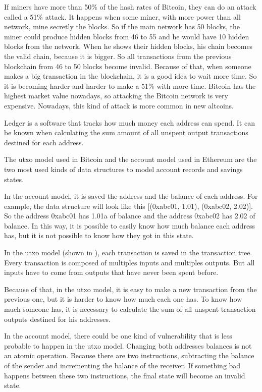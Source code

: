 If miners have more than 50\% of the hash rates of Bitcoin, they can do an attack called a
51\% attack.
It happens when some miner, with more power than all network, mine secretly the blocks.
So if the main network has 50 blocks, the miner could produce hidden blocks from 46 to 55
and he would have 10 hidden blocks from the network.
When he shows their hidden blocks, his chain becomes the valid chain, because it is bigger.
So all transactions from the previous blockchain from 46 to 50 blocks become invalid.
Because of that, when someone makes a big transaction in the blockchain, it is a good idea
to wait more time.
So it is becoming harder and harder to make a 51\% with more time.
Bitcoin has the highest market value nowadays, so attacking the Bitcoin network is very expensive.
Nowadays, this kind of attack is more common in new altcoins.

Ledger is a software that tracks how much money each address can spend.
It can be known when calculating the sum amount of all unspent output transactions destined
for each address.

The \gls{utxo} model used in Bitcoin and the account model used in Ethereum are the two most used kinds
of data structures to model account records and savings states.

In the account model, it is saved the address and the balance of each address.
For example, the data structure will look like this [(0xabc01, 1.01), (0xabc02, 2.02)].
So the address 0xabc01 has 1.01a of balance and the address 0xabc02 has 2.02 of balance.
In this way, it is possible to easily know how much balance each address has,
but it is not possible to know how they got in this state.


In the \gls{utxo} model (shown in ), each transaction is saved in the transaction tree.
Every transaction is composed of multiples inputs and multiples outputs.
But all inputs have to come from outputs that have never been spent before.

Because of that, in the \gls{utxo} model, it is easy to make a new transaction from the previous one,
but it is harder to know how much each one has.
To know how much someone has, it is necessary to calculate the sum of all unspent transaction outputs
destined for his addresses.

In the account model, there could be one kind of vulnerability
that is less probable to happen in the \gls{utxo} model.
Changing both addresses balances is not an atomic operation.
Because there are two instructions, subtracting the balance of the sender
and incrementing the balance of the receiver.
If something bad happens between these two instructions, the final state
will become an invalid state.

